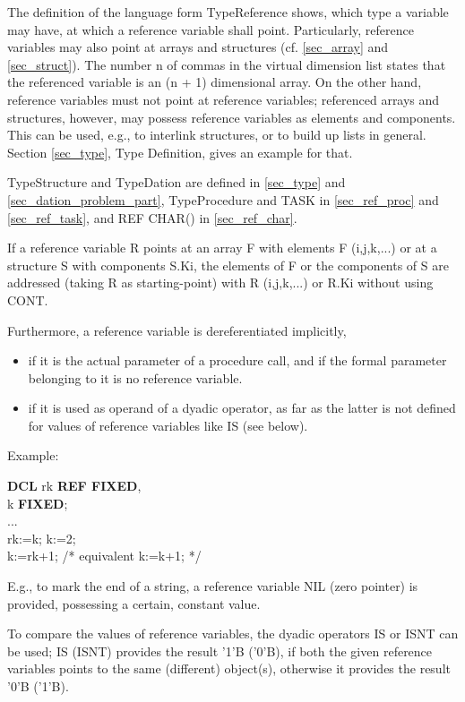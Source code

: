 The definition of the language form TypeReference shows, which type a
variable may have, at which a reference variable shall point.
Particularly, reference variables may also point at arrays and
structures (cf. \ref{sec_array} and \ref{sec_struct}).
 The number n of commas in the virtual
dimension list states that the referenced variable is an (n + 1)
dimensional array. On the other hand, reference variables must not point
at reference variables; referenced arrays and structures, however, may
possess reference variables as elements and components. This can be
used, e.g., to interlink structures, or to build up lists in general.
Section \ref{sec_type}, Type Definition, gives an example for that.

TypeStructure and TypeDation are defined in \ref{sec_type} and 
\ref{sec_dation_problem_part}, TypeProcedure and 
TASK in \ref{sec_ref_proc} and \ref{sec_ref_task},
 and REF CHAR() in 
 \ref{sec_ref_char}.


If a reference variable R points at an array F with elements F
(i,j,k,...) or at a structure S with components S.Ki, the elements of F
or the components of S are addressed (taking R as starting-point) with R
(i,j,k,...) or R.Ki without using CONT.

Furthermore, a reference variable is dereferentiated implicitly,
\begin{itemize}
\item if it is the actual parameter of a procedure call, and if the
formal parameter belonging to it is no reference variable.
\item if it is used as operand of a dyadic operator, as far as the
latter is not defined for values of reference variables like IS (see
below).
\end{itemize}

Example:

{\bf DCL} rk {\bf REF FIXED},\\
\x k {\bf FIXED};\\
\x ...\\
\x rk:=k; k:=2;\\
\x k:=rk+1; /* equivalent     k:=k+1; */

E.g., to mark the end of a string, a reference variable NIL (zero
pointer) is provided, possessing a certain, constant value.

To compare the values of reference variables, the dyadic operators IS or
ISNT can be used; IS (ISNT) provides the result '1'B ('0'B), if both the
given reference variables points to the same (different) object(s),
otherwise it provides the result '0'B ('1'B).

